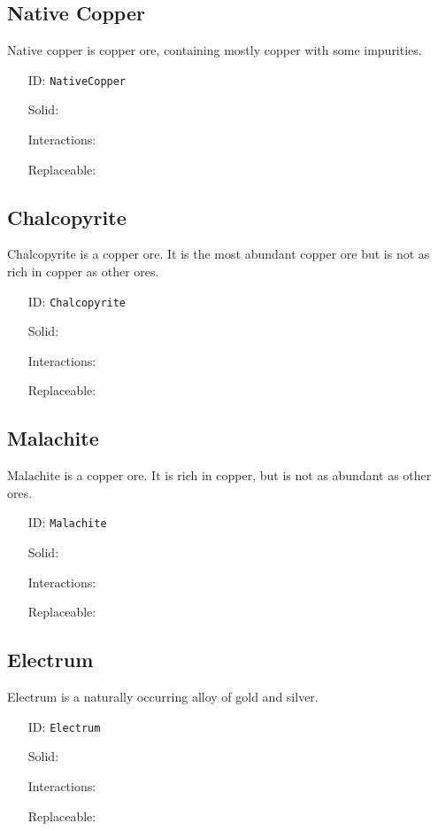 \subsection{Native Copper}\label{subsec:blocks_native copper}
Native copper is copper ore, containing mostly copper with some impurities.
\newline
\begin{itemize}[nosep]
\item[ID:] \texttt{NativeCopper}
\item[Solid:]  \Checkmark \item[Interactions:]  \XSolidBrush \item[Replaceable:]  \XSolidBrush \end{itemize}

\subsection{Chalcopyrite}\label{subsec:blocks_chalcopyrite}
Chalcopyrite is a copper ore.
                It is the most abundant copper ore but is not as rich in copper as other ores.
\newline
\begin{itemize}[nosep]
\item[ID:] \texttt{Chalcopyrite}
\item[Solid:]  \Checkmark \item[Interactions:]  \XSolidBrush \item[Replaceable:]  \XSolidBrush \end{itemize}

\subsection{Malachite}\label{subsec:blocks_malachite}
Malachite is a copper ore.
                It is rich in copper, but is not as abundant as other ores.
\newline
\begin{itemize}[nosep]
\item[ID:] \texttt{Malachite}
\item[Solid:]  \Checkmark \item[Interactions:]  \XSolidBrush \item[Replaceable:]  \XSolidBrush \end{itemize}

\subsection{Electrum}\label{subsec:blocks_electrum}
Electrum is a naturally occurring alloy of gold and silver.
\newline
\begin{itemize}[nosep]
\item[ID:] \texttt{Electrum}
\item[Solid:]  \Checkmark \item[Interactions:]  \XSolidBrush \item[Replaceable:]  \XSolidBrush \end{itemize}

